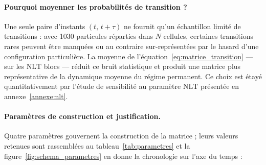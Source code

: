 \documentclass[french]{MemoireMaster}
\begin{document}
\paragraph{Pourquoi moyenner les probabilités de transition ?} Une seule paire d'instants $(t,\, t+\tau)$ ne fournit qu'un échantillon limité de transitions : avec 1030 particules réparties dans $N$ cellules, certaines transitions rares peuvent être manquées ou au contraire sur-représentées par le hasard d'une configuration particulière. La moyenne de l'équation~\eqref{eq:matrice_transition} --- sur les $\mathrm{NLT}$ blocs --- réduit ce bruit statistique et produit une matrice plus représentative de la dynamique moyenne du régime permanent. Ce choix est étayé quantitativement par l'étude de sensibilité au paramètre $\mathrm{NLT}$ présentée en annexe~\ref{annexe:nlt}.

\paragraph{Paramètres de construction et justification.} Quatre paramètres gouvernent la construction de la matrice ; leurs valeurs retenues sont rassemblées au tableau~\ref{tab:parametres} et la figure~\ref{fig:schema_parametres} en donne la chronologie sur l'axe du temps :
\end{document}
